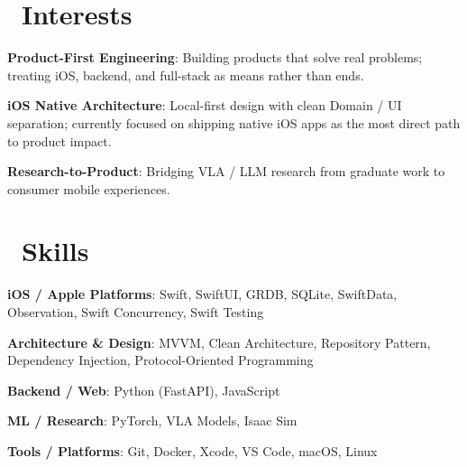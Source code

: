 \documentclass{resume}
\begin{document}
\section{\texorpdfstring{\faLightbulb\ }{}\textbf{Interests}}

\begin{compactlist}
	\item \textbf{Product-First Engineering}: Building products that solve real problems; treating iOS, backend, and full-stack as means rather than ends.
	\item \textbf{iOS Native Architecture}: Local-first design with clean Domain / UI separation; currently focused on shipping native iOS apps as the most direct path to product impact.
	\item \textbf{Research-to-Product}: Bridging VLA / LLM research from graduate work to consumer mobile experiences.
\end{compactlist}

\section{\texorpdfstring{\faCogs\ }{}\textbf{Skills}}

\begin{compactlist}
	\item \textbf{iOS / Apple Platforms}: Swift, SwiftUI, GRDB, SQLite, SwiftData, Observation, Swift Concurrency, Swift Testing
	\item \textbf{Architecture \& Design}: MVVM, Clean Architecture, Repository Pattern, Dependency Injection, Protocol-Oriented Programming
	\item \textbf{Backend / Web}: Python (FastAPI), JavaScript
	\item \textbf{ML / Research}: PyTorch, VLA Models, Isaac Sim
	\item \textbf{Tools / Platforms}: Git, Docker, Xcode, VS Code, macOS, Linux
\end{compactlist}
\end{document}

